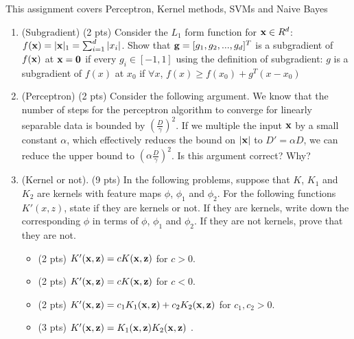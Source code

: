 \documentclass{article}
\def\z{{\bf z}}
\def\x{{\bf x}}
\begin{document}
This assignment covers Perceptron, Kernel methods, SVMs and Naive Bayes
\begin{enumerate}
\item (Subgradient) (2 pts) Consider the $L_1$ form function for 
$\x\in R^d$: $f(\x)=|\x|_1=\sum_{i=1}^d|x_i|$. Show that 
${\bf g}=[g_1, g_2, ...,g_d]^T$ is a subgradient of $f(\x)$ at $\x={\bf 0}$ if 
every $g_i \in [-1,1] $ using the definition of subgradient: $g$ is a subgradient of $f(x)$ at $x_0$ if $\forall x$, $f(x)\geq f(x_0)+g^T(x-x_0)$

\answer{

}

\item (Perceptron) (2 pts) Consider the following argument. We know that the 
number of steps for the perceptron algorithm to converge for linearly separable 
data is bounded by $(\frac{D}{\gamma})^2$. If we multiple the input $\x$ by a 
small constant $\alpha$, which effectively reduces the bound on $|\x|$ to 
$D' =\alpha D$, we can reduce the upper bound to $(\alpha \frac{D}{\gamma})^2$. 
Is this argument correct? Why? 


\item (Kernel or not). (9 pts) In the following problems, suppose that $K$, 
$K_1$ and $K_2$ are kernels with feature maps $\phi$, $\phi_1$ and $\phi_2$. 
For the following functions $K'(x, z)$, state if they are kernels or not. If 
they are kernels, write down the corresponding $\phi$ in terms of $\phi$, 
$\phi_1$ and $\phi_2$. If they are not kernels, prove that they are not.

\begin{itemize}
\item (2 pts) $K'(\x, \z) = cK(\x, \z)$ for $c > 0$.\\
\item (2 pts) $K'(\x,\z) = cK(\x, \z)$ for $c < 0$.\\
\item (2 pts) $K'(\x,\z)= c_1K_1(\x, \z)+c_2K_2(\x,\z)$ for $c_1, c_2 >0$.\\
\item (3 pts) $K'(\x,\z)= K_1(\x, \z)K_2(\x,\z)$ .\\


\end{itemize}
\end{enumerate}
\end{document}
